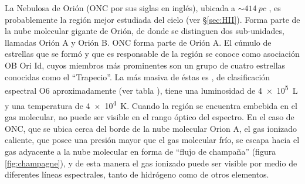 La Nebulosa de Orión (ONC por sus siglas en inglés), ubicada a $\sim \SI{414}{pc}$ \citep{Menten:2007}, es probablemente la región  mejor estudiada del cielo (ver \S \ref{sec:HII}). Forma parte de la nube molecular gigante de Orión, de donde se distinguen dos sub-unidades, llamadas Orión A y Orión B. ONC forma parte de Orión A. El cúmulo de estrellas que se formó y que es responsable de la región  se conoce como asociación OB Ori Id, cuyos miembros más prominentes son un grupo de cuatro estrellas conocidas como el ``Trapecio''. La más masiva de éstas es \thC{}, de clasificación espectral O6 aproximadamente (ver tabla ), tiene una luminosidad de \SI{4e5}{L_\odot} y una temperatura de \SI{4e4}{K}. Cuando la región  se encuentra embebida en el gas molecular,  no puede ser visible en el rango óptico del espectro. En el caso de ONC, que se ubica cerca del borde de la nube molecular Orion A, el gas ionizado caliente, que posee una presión mayor que el gas molecular frío, se escapa hacia el gas adyacente a la nube molecular en forma de ``flujo de champaña'' (figura \ref{fig:champagne}), y de esta manera el gas ionizado puede ser visible por medio de diferentes líneas espectrales, tanto de hidrógeno como de otros elementos. 

